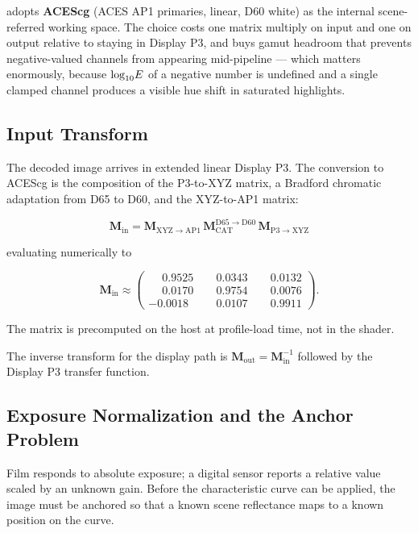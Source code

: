 \EM{} adopts \textbf{ACEScg} \cite{acescg,st2065} (ACES AP1 primaries, linear,
D60 white) as the
internal scene-referred working space. The choice costs one matrix multiply on
input and one on output relative to staying in Display P3, and buys gamut
headroom that prevents negative-valued channels from appearing mid-pipeline ---
which matters enormously, because $\log_{10}\!E$ of a negative number is undefined and
a single clamped channel produces a visible hue shift in saturated highlights.

\subsection{Input Transform}

The decoded image arrives in extended linear Display P3. The conversion to
ACEScg is the composition of the P3-to-XYZ matrix, a Bradford
\cite{lam1985} chromatic
adaptation from D65 to D60, and the XYZ-to-AP1 matrix:

\begin{equation}
\mathbf{M}_{\mathrm{in}} = \mathbf{M}_{\mathrm{XYZ}\to\mathrm{AP1}}\,
\mathbf{M}_{\mathrm{CAT}}^{\mathrm{D65}\to\mathrm{D60}}\,
\mathbf{M}_{\mathrm{P3}\to\mathrm{XYZ}}
\label{eq:min}
\end{equation}

evaluating numerically to

\begin{equation}
\mathbf{M}_{\mathrm{in}} \approx
\begin{pmatrix}
\phantom{-}0.9525 & \phantom{-}0.0343 & \phantom{-}0.0132 \\
\phantom{-}0.0170 & \phantom{-}0.9754 & \phantom{-}0.0076 \\
-0.0018 & \phantom{-}0.0107 & \phantom{-}0.9911
\end{pmatrix}.
\label{eq:minval}
\end{equation}

The matrix is precomputed on the host at profile-load time, not in the shader.

The inverse transform for the display path is $\mathbf{M}_{\mathrm{out}} =
\mathbf{M}_{\mathrm{in}}^{-1}$ followed by the Display P3 transfer function.

\subsection{Exposure Normalization and the Anchor Problem}

Film responds to absolute exposure; a digital sensor reports a relative value
scaled by an unknown gain. Before the characteristic curve can be applied, the
image must be anchored so that a known scene reflectance maps to a known
position on the curve.

